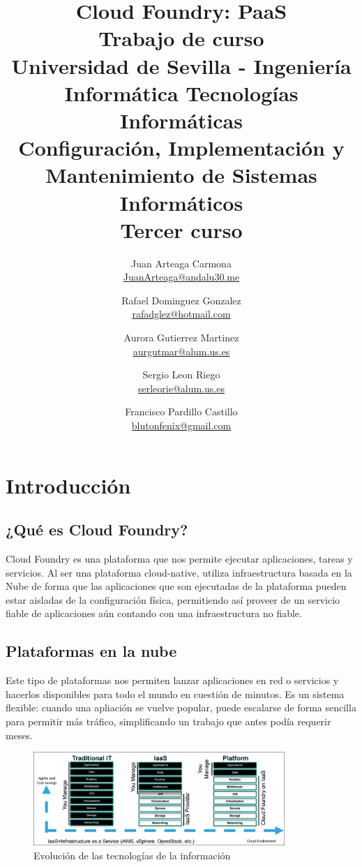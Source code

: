 \documentclass[a4paper,11pt]{article}
\title{
        \textbf{Cloud Foundry: PaaS}\large\\
        \textbf{Trabajo de curso}\\
        \medskip
        Universidad de Sevilla - Ingeniería Informática Tecnologías Informáticas\\
        Configuración, Implementación y Mantenimiento de Sistemas Informáticos\\
        Tercer curso}
\author{
Juan Arteaga Carmona\\ \href{mailto:JuanArteaga@andalu30.me}{JuanArteaga@andalu30.me}
\and
Rafael Dominguez Gonzalez\\ \href{mailto:rafadglez@hotmail.com}{rafadglez@hotmail.com}
\and
Aurora Gutierrez Martinez\\ \href{mailto:aurgutmar@alum.us.es}{aurgutmar@alum.us.es}
\and
Sergio Leon Riego\\ \href{mailto:serleorie@alum.us.es}{serleorie@alum.us.es}
\and
Francisco Pardillo Castillo\\ \href{mailto:blutonfenix@gmail.com}{blutonfenix@gmail.com}
}
\begin{document}
\maketitle

\newpage
\tableofcontents
\listoffigures %

\renewcommand{\listtablename}{Índice de tablas} %
\listoftables


\newpage



\section{Introducción}

\subsection{¿Qué es Cloud Foundry?}
Cloud Foundry es una plataforma que nos permite ejecutar aplicaciones, tareas y servicios. Al ser una plataforma cloud-native, utiliza infraestructura basada en la Nube de forma que las aplicaciones que son ejecutadas de la plataforma pueden estar aisladas de la configuración física, permitiendo así proveer de un servicio fiable de aplicaciones aún contando con una infraestructura no fiable.

\subsection{Plataformas en la nube}
Este tipo de plataformas nos permiten lanzar aplicaciones en red o servicios y hacerlos disponibles para todo el mundo en cuestión de minutos. Es un sistema flexible: cuando una apliación se vuelve popular, puede escalarse de forma sencilla para permitir más tráfico, simplificando un trabajo que antes podía requerir meses.
\begin{figure}[h]
    \centering
    \includegraphics[width=0.85\textwidth]{power-of-platform.png}
    \caption{Evolución de las tecnologías de la información}
    \label{fig:powerplat}
\end{figure}
\end{document}
